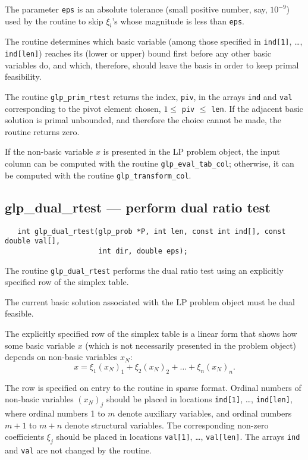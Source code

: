 The parameter \verb|eps| is an absolute tolerance (small positive
number, say, $10^{-9}$) used by the routine to skip $\xi_i$'s whose
magnitude is less than \verb|eps|.

The routine determines which basic variable (among those specified in
\verb|ind[1]|, \dots, \verb|ind[len]|) reaches its (lower or upper)
bound first before any other basic variables do, and which, therefore,
should leave the basis in order to keep primal feasibility.

\returns

The routine \verb|glp_prim_rtest| returns the index, \verb|piv|, in the
arrays \verb|ind| and \verb|val| corresponding to the pivot element
chosen, $1\leq$ \verb|piv| $\leq$ \verb|len|. If the adjacent basic
solution is primal unbounded, and therefore the choice cannot be made,
the routine returns zero.


If the non-basic variable $x$ is presented in the LP problem object,
the input column can be computed with the routine
\verb|glp_eval_tab_col|; otherwise, it can be computed with the routine
\verb|glp_transform_col|.

\newpage

\subsection{glp\_dual\_rtest --- perform dual ratio test}

\synopsis

\begin{verbatim}
   int glp_dual_rtest(glp_prob *P, int len, const int ind[], const double val[],
                      int dir, double eps);
\end{verbatim}

\description

The routine \verb|glp_dual_rtest| performs the dual ratio test using
an explicitly specified row of the simplex table.

The current basic solution associated with the LP problem object must
be dual feasible.

The explicitly specified row of the simplex table is a linear form
that shows how some basic variable $x$ (which is not necessarily
presented in the problem object) depends on non-basic variables $x_N$:
$$x=\xi_1(x_N)_1+\xi_2(x_N)_2+\dots+\xi_n(x_N)_n.$$

The row is specified on entry to the routine in sparse format. Ordinal
numbers of non-basic variables $(x_N)_j$ should be placed in locations
\verb|ind[1]|, \dots, \verb|ind[len]|, where ordinal numbers 1 to $m$
denote auxiliary variables, and ordinal numbers $m+1$ to $m+n$ denote
structural variables. The corresponding non-zero coefficients $\xi_j$
should be placed in locations \verb|val[1]|, \dots, \verb|val[len]|.
The arrays \verb|ind| and \verb|val| are not changed by the routine.

